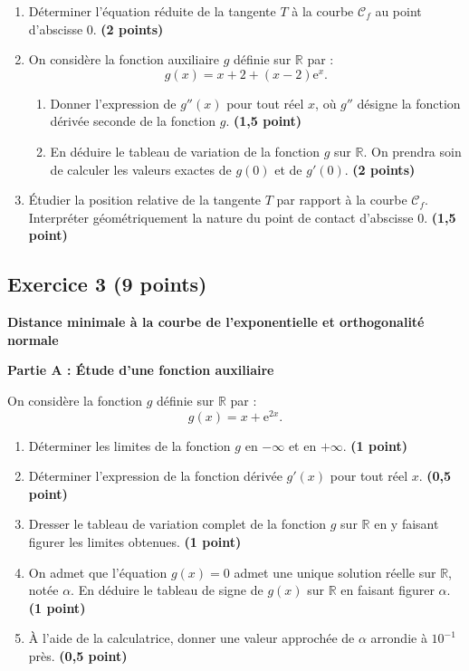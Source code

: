 \documentclass[11pt,a4paper]{article}
\newcommand{\R}{\mathbb{R}}
\newcommand{\e}{\mathrm{e}}
\begin{document}
\begin{enumerate}[label=\textbf{\arabic*.}]
    \item Déterminer l'équation réduite de la tangente $T$ à la courbe $\mathcal{C}_f$ au point d'abscisse $0$. \hfill \textbf{(2 points)}
    \item On considère la fonction auxiliaire $g$ définie sur $\R$ par :
    \[
    g(x) = x + 2 + (x-2)\e^x.
    \]
    \begin{enumerate}[label=\textbf{(\alph*)}]
        \item Donner l'expression de $g''(x)$ pour tout réel $x$, où $g''$ désigne la fonction dérivée seconde de la fonction $g$. \hfill \textbf{(1{,}5 point)}
        \item En déduire le tableau de variation de la fonction $g$ sur $\R$. On prendra soin de calculer les valeurs exactes de $g(0)$ et de $g'(0)$. \hfill \textbf{(2 points)}
    \end{enumerate}
    \item Étudier la position relative de la tangente $T$ par rapport à la courbe $\mathcal{C}_f$. Interpréter géométriquement la nature du point de contact d'abscisse $0$. \hfill \textbf{(1{,}5 point)}
\end{enumerate}

\vspace{0.5cm}

\subsection*{Exercice 3 \hfill \normalfont\normalsize (9 points)}
\textbf{Distance minimale à la courbe de l'exponentielle et orthogonalité normale}

\medskip
\textbf{Partie A : Étude d'une fonction auxiliaire}

On considère la fonction $g$ définie sur $\R$ par :
\[
g(x) = x + \e^{2x}.
\]
\begin{enumerate}[label=\textbf{\arabic*.}]
    \item Déterminer les limites de la fonction $g$ en $-\infty$ et en $+\infty$. \hfill \textbf{(1 point)}
    \item Déterminer l'expression de la fonction dérivée $g'(x)$ pour tout réel $x$. \hfill \textbf{(0{,}5 point)}
    \item Dresser le tableau de variation complet de la fonction $g$ sur $\R$ en y faisant figurer les limites obtenues. \hfill \textbf{(1 point)}
    \item On admet que l'équation $g(x) = 0$ admet une unique solution réelle sur $\R$, notée $\alpha$. En déduire le tableau de signe de $g(x)$ sur $\R$ en faisant figurer $\alpha$. \hfill \textbf{(1 point)}
    \item À l'aide de la calculatrice, donner une valeur approchée de $\alpha$ arrondie à $10^{-1}$ près. \hfill \textbf{(0{,}5 point)}
\end{enumerate}
\end{document}
